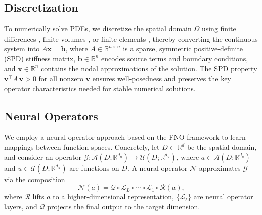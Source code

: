 \subsection{Discretization}
\label{subsec:discretization}

To numerically solve PDEs, we discretize the spatial domain \(\Omega\) using finite differences \cite{07:Finite}, finite volumes \cite{00:Finite}, or finite elements \cite{12:Numerical}, thereby converting the continuous system into $A\mathbf{x} = \mathbf{b}$, where \(A\in\mathbb{R}^{n\times n}\) is a sparse, symmetric positive-definite (SPD) stiffness matrix, \(\mathbf{b}\in\mathbb{R}^n\) encodes source terms and boundary conditions, and \(\mathbf{x}\in\mathbb{R}^n\) contains the nodal approximations of the solution. The SPD property \(\mathbf{v}^\top A\,\mathbf{v}>0\) for all nonzero \(\mathbf{v}\) ensures well-posedness and preserves the key operator characteristics needed for stable numerical solutions.

\subsection{Neural Operators}
We employ a neural operator approach based on the FNO framework \cite{21:fno,23:no} to learn mappings between function spaces. Concretely, let \(D \subset \mathbb{R}^d\) be the spatial domain, and consider an operator $\mathcal{G}: \mathcal{A}(D;\mathbb{R}^{d_a}) \to \mathcal{U}(D;\mathbb{R}^{d_u})$, where \(a \in \mathcal{A}(D;\mathbb{R}^{d_a})\) and \(u \in \mathcal{U}(D;\mathbb{R}^{d_u})\) are functions on \(D\). A neural operator \(\mathcal{N}\) approximates \(\mathcal{G}\) via the composition
\begin{equation}
    \mathcal{N}(a) = \mathcal{Q}\circ\mathcal{L}_L\circ\cdots\circ\mathcal{L}_1\circ\mathcal{R}(a),
\end{equation}
where \(\mathcal{R}\) lifts \(a\) to a higher-dimensional representation, \(\{\mathcal{L}_\ell\}\) are neural operator layers, and \(\mathcal{Q}\) projects the final output to the target dimension.

